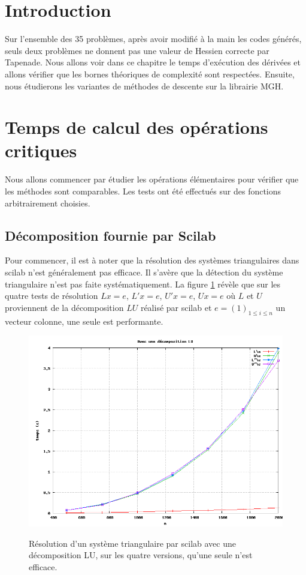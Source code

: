



\section{Introduction}
Sur l'ensemble des 35 probl\`emes, apr\`es avoir modifi\'e \`a la main les codes g\'en\'er\'es, seuls deux probl\`emes ne donnent
pas une valeur de Hessien correcte par Tapenade. Nous allons voir dans ce chapitre le temps d'ex\'ecution 
des d\'eriv\'ees et allons v\'erifier que les bornes th\'eoriques de complexit\'e sont respect\'ees. 
Ensuite, nous \'etudierons les variantes de m\'ethodes de descente sur la librairie MGH.


\section{Temps de calcul des op\'erations critiques}
Nous allons commencer par \'etudier les op\'erations \'el\'ementaires pour v\'erifier que les m\'ethodes sont comparables.
Les tests ont \'et\'e effectu\'es sur des fonctions arbitrairement choisies.
% 


\subsection{D\'ecomposition fournie par Scilab}
\label{chap4:decomp}
Pour commencer, il est \`a noter que la r\'esolution 
des syst\`emes triangulaires dans scilab n'est g\'en\'eralement pas efficace. Il s'av\`ere que la d\'etection du syst\`eme triangulaire 
n'est pas faite syst\'ematiquement. La figure \ref{fig:lu} r\'ev\`ele que sur les quatre tests de r\'esolution
 $Lx=e$, $L'x=e$, $U'x=e$, $Ux=e$ o\`u $L$ et $U$ proviennent de la d\'ecomposition $LU$ r\'ealis\'e par scilab et
 $e=(1)_{1\leq i\leq n}$ un vecteur colonne, une seule est performante.

\begin{figure}
\caption{R\'esolution d'un syst\`eme triangulaire par scilab avec une d\'ecomposition LU, sur les quatre versions,
qu'une seule n'est efficace.}
\center
\includegraphics[scale=0.39]{figures/LU.png}
\label{fig:lu}
\end{figure}


